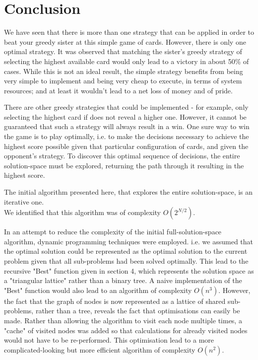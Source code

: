 \documentclass[11pt]{article}
\begin{document}
\section{Conclusion}

We have seen that there is more than one strategy that can be applied in order to beat your greedy sister at this simple game of cards. However, there is only one optimal strategy. It was observed that matching the sister's greedy strategy of selecting the highest available card would only lead to a victory in about 50\% of cases. While this is not an ideal result, the simple strategy benefits from being very simple to implement and being very cheap to execute, in terms of system resources; and at least it wouldn't lead to a net loss of money and of pride.

There are other greedy strategies that could be implemented - for example, only selecting the highest card if does not reveal a higher one. However, it cannot be guaranteed that such a strategy will always result in a win. One sure way to win the game is to play optimally, i.e. to make the decisions necessary to achieve the highest score possible given that particular configuration of cards, and given the opponent's strategy. To discover this optimal sequence of decisions, the entire solution-space must be explored, returning the path through it resulting in the highest score.

The initial algorithm presented here, that explores the entire solution-space, is an iterative one.\\
We identified that this algorithm was of complexity  $O(2^{N/2})$.

In an attempt to reduce the complexity of the initial full-solution-space algorithm, dynamic programming techniques were employed. i.e. we assumed that the optimal solution could be represented as the optimal solution to the current problem given that all sub-problems had been solved optimally. This lead to the recursive "Best" function given in section 4, which represents the solution space as a "triangular lattice" rather than a binary tree. A naive implementation of the "Best" function would also lead to an algorithm of complexity $O(n^3)$. However, the fact that the graph of nodes is now represented as a lattice of shared sub-problems, rather than a tree, reveals the fact that optimisations can easily be made. Rather than allowing the algorithm to visit each node multiple times, a "cache" of visited nodes was added so that calculations for already visited nodes would not have to be re-performed. This optimisation lead to a more complicated-looking but more efficient algorithm of complexity $O(n^2)$.



\end{document}
